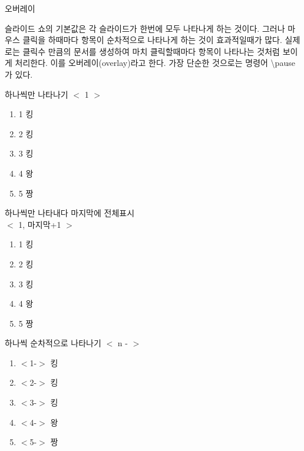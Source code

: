 \documentclass[9pt,blue,xcolor=pdftex,dvipsnames,table,handout,notes]{beamer}
\begin{document}
		\begin{frame}[t]{오버레이}

		슬라이드 쇼의 기본값은 각 슬라이드가 한번에 모두 나타나게 하는 것이다.
		그러나 마우스 클릭을 하때마다 항목이 순차적으로 나타나게 하는 것이 효과적일때가 많다.
		실제로는 클릭수 만큼의 문서를 생성하여 마치 클릭할때마다 항목이 나타나는 것처럼 보이게 처리한다. 
		이를 오버레이(overlay)라고 한다. 가장 단순한 것으로는 명령어 \textbackslash pause가 있다.


			\begin{block} {하나씩만 나타나기 $<$ 1 $>$ }
			\begin{enumerate}
			\item <1> 1 킹
			\item <2> 2 킹
			\item <3> 3 킹
			\item <4> 4 왕
			\item <5> 5 짱
			\end{enumerate}
			\end{block} 


			\begin{block} {하나씩만 나타내다 마지막에 전체표시\\
						$<$ 1, 마지막+1 $>$ }
			\begin{enumerate}
			\item <1,6> 1 킹
			\item <2,6> 2 킹
			\item <3,6> 3 킹
			\item <4,6> 4 왕
			\item <5,6> 5 짱
			\end{enumerate}
			\end{block} 


			\begin{block} {하나씩 순차적으로 나타나기 $<$ n - $>$ }
			\begin{enumerate}
			\item <1-> $<$1-$>$ 킹
			\item <2-> $<$2-$>$ 킹
			\item <3-> $<$3-$>$ 킹
			\item <4-> $<$4-$>$ 왕
			\item <5-> $<$5-$>$ 짱
			\end{enumerate}
			\end{block}



\end{frame}
\end{document}
